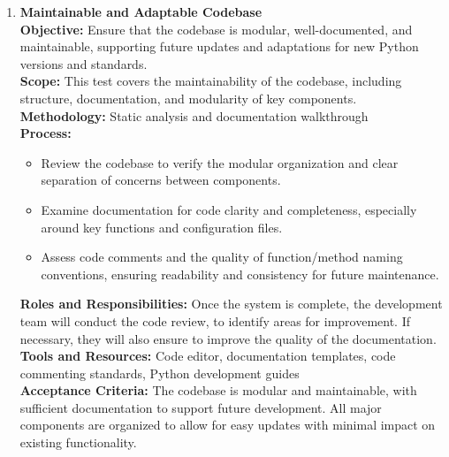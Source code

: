 \documentclass[12pt, titlepage]{article}
\begin{document}
\begin{enumerate}[label={\bf \textcolor{Maroon}{test-MS-\arabic*}},
      wide=0pt, font=\itshape]
    \item \textbf{Maintainable and Adaptable Codebase} \\[2mm]
      \textbf{Objective:} Ensure that the codebase is modular,
      well-documented, and maintainable, supporting future updates
      and adaptations for new Python versions and standards. \\[2mm]
      \textbf{Scope:} This test covers the maintainability of the
      codebase, including structure, documentation, and modularity of
      key components. \\[2mm]
      \textbf{Methodology:} Static analysis and documentation
      walkthrough \\[2mm]
      \textbf{Process:}
      \begin{itemize}
        \item Review the codebase to verify the modular organization
          and clear separation of concerns between components.
        \item Examine documentation for code clarity and
          completeness, especially around key functions and configuration files.
        \item Assess code comments and the quality of function/method
          naming conventions, ensuring readability and consistency
          for future maintenance.
      \end{itemize}
      \textbf{Roles and Responsibilities:} Once the system is
      complete, the development team will conduct the code review, to
      identify areas for improvement. If necessary, they will also
      ensure to improve the quality of the documentation. \\[2mm]
      \textbf{Tools and Resources:} Code editor, documentation
      templates, code commenting standards, Python development guides \\[2mm]
      \textbf{Acceptance Criteria:} The codebase is modular and
      maintainable, with sufficient documentation to support future
      development. All major components are organized to allow for
      easy updates with minimal impact on existing functionality.


\end{enumerate}
\end{document}
